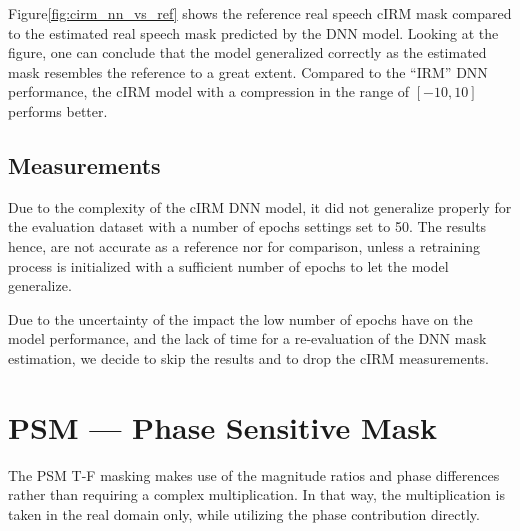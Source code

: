 Figure\;\ref{fig:cirm_nn_vs_ref} shows the reference real speech cIRM mask
compared to the estimated real speech mask predicted by the DNN model.
Looking at the figure, one can conclude that the model generalized correctly
as the estimated mask resembles the reference to a great extent.
Compared to the ``IRM'' DNN performance, the cIRM model 
with a compression in the range of \([-10, 10]\) performs better.

\subsection{Measurements}
Due to the complexity of the cIRM DNN model, 
it did not generalize properly for the evaluation dataset
with a number of epochs settings set to 50.
The results hence, are not accurate as a reference nor for comparison,
unless a retraining process is initialized with a sufficient number of epochs
to let the model generalize.

Due to the uncertainty of the impact the low number of epochs have
on the model performance, and the lack of time for a re-evaluation of the
DNN mask estimation, we decide to skip the results and 
to drop the cIRM measurements.


\section{PSM --- Phase Sensitive Mask}
The PSM T-F masking makes use of the magnitude ratios and phase differences
rather than requiring a complex multiplication.
In that way, the multiplication is taken in the real domain only,
while utilizing the phase contribution directly.

